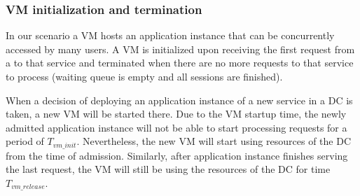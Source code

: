 \subsubsection{VM initialization and termination}
In our scenario a VM hosts an application instance that can be concurrently accessed by many users.
A VM is initialized upon receiving the first request from a \ue{} to that service and terminated when there are no more requests to that service to process (waiting queue is empty and all sessions are finished).

When a decision of deploying an application instance of a new service in a \ac{DC} is taken, a new \ac{VM} will be started there.
Due to the \ac{VM} startup time, the newly admitted application instance will not be able to start processing requests for a period of $T_{vm\_init}$. 
Nevertheless, the new VM will start using resources of the \ac{DC} from the time of admission.
Similarly, after application instance finishes serving the last request, the \ac{VM} will still be using the resources of the \ac{DC} for time $T_{vm\_release}$.


